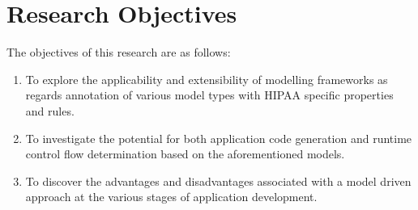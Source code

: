 \chapter{Research Objectives}
The objectives of this research are as follows:

\begin{enumerate}
	\item To explore the applicability and extensibility of modelling frameworks as regards annotation of various model types with HIPAA specific properties and rules.
	\item To investigate the potential for both application code generation and runtime control flow determination based on the aforementioned models.
	\item To discover the advantages and disadvantages associated with a model driven approach at the various stages of application development.
\end{enumerate}